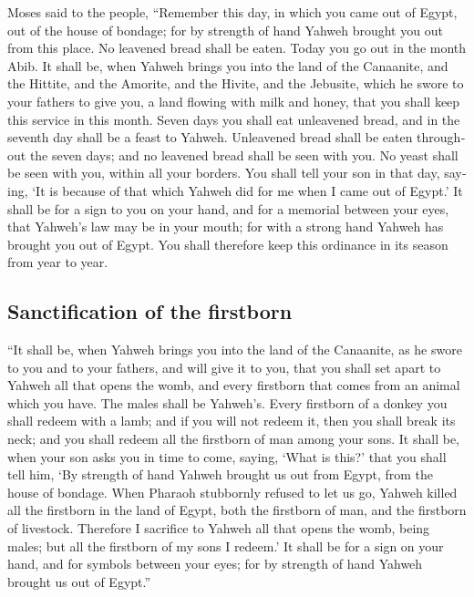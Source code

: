 \begin{paracol}{2}
\begin{otherlanguage}{english}
 Moses said to the people, ``Remember this day, in which
you came out of Egypt, out of the house of bondage; for by strength of
hand Yahweh brought you out from this place. No leavened bread shall be
eaten.  Today you go out in the month Abib. 
It shall be, when Yahweh brings you into the land of the Canaanite, and
the Hittite, and the Amorite, and the Hivite, and the Jebusite, which he
swore to your fathers to give you, a land flowing with milk and honey,
that you shall keep this service in this month.  Seven
days you shall eat unleavened bread, and in the seventh day shall be a
feast to Yahweh.  Unleavened bread shall be eaten
throughout the seven days; and no leavened bread shall be seen with you.
No yeast shall be seen with you, within all your borders. 
You shall tell your son in that day, saying, `It is because of that
which Yahweh did for me when I came out of Egypt.'  It
shall be for a sign to you on your hand, and for a memorial between your
eyes, that Yahweh's law may be in your mouth; for with a strong hand
Yahweh has brought you out of Egypt.  You shall therefore
keep this ordinance in its season from year to year.

\hypertarget{sanctification-of-the-firstborn}{%
\subsection{Sanctification of the
firstborn}\label{sanctification-of-the-firstborn}}

 ``It shall be, when Yahweh brings you into the land of
the Canaanite, as he swore to you and to your fathers, and will give it
to you,  that you shall set apart to Yahweh all that
opens the womb, and every firstborn that comes from an animal which you
have. The males shall be Yahweh's.  Every firstborn of a
donkey you shall redeem with a lamb; and if you will not redeem it, then
you shall break its neck; and you shall redeem all the firstborn of man
among your sons.  It shall be, when your son asks you in
time to come, saying, `What is this?' that you shall tell him, `By
strength of hand Yahweh brought us out from Egypt, from the house of
bondage.  When Pharaoh stubbornly refused to let us go,
Yahweh killed all the firstborn in the land of Egypt, both the firstborn
of man, and the firstborn of livestock. Therefore I sacrifice to Yahweh
all that opens the womb, being males; but all the firstborn of my sons I
redeem.'  It shall be for a sign on your hand, and for
symbols between your eyes; for by strength of hand Yahweh brought us out
of Egypt.''


\end{otherlanguage}
\end{paracol}
